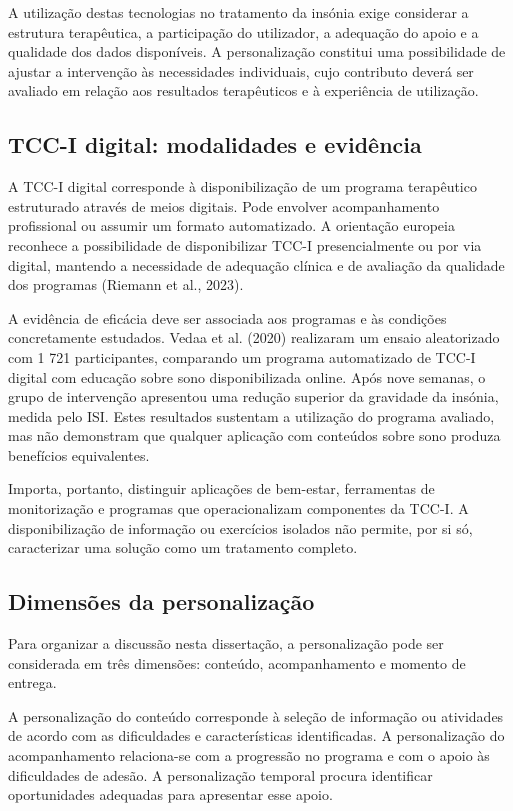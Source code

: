 A utilização destas tecnologias no tratamento da insónia exige considerar a estrutura terapêutica, a participação do utilizador, a adequação do apoio e a qualidade dos dados disponíveis. A personalização constitui uma possibilidade de ajustar a intervenção às necessidades individuais, cujo contributo deverá ser avaliado em relação aos resultados terapêuticos e à experiência de utilização.  


\subsection{TCC-I digital: modalidades e evidência}
\label{sec:chap2_tccDigital}

A TCC-I digital corresponde à disponibilização de um programa terapêutico estruturado através de meios digitais. Pode envolver acompanhamento profissional ou assumir um formato automatizado. A orientação europeia reconhece a possibilidade de disponibilizar TCC-I presencialmente ou por via digital, mantendo a necessidade de adequação clínica e de avaliação da qualidade dos programas (Riemann et al., 2023).

A evidência de eficácia deve ser associada aos programas e às condições concretamente estudados. Vedaa et al. (2020) realizaram um ensaio aleatorizado com 1 721 participantes, comparando um programa automatizado de TCC-I digital com educação sobre sono disponibilizada online. Após nove semanas, o grupo de intervenção apresentou uma redução superior da gravidade da insónia, medida pelo ISI. Estes resultados sustentam a utilização do programa avaliado, mas não demonstram que qualquer aplicação com conteúdos sobre sono produza benefícios equivalentes.

Importa, portanto, distinguir aplicações de bem-estar, ferramentas de monitorização e programas que operacionalizam componentes da TCC-I. A disponibilização de informação ou exercícios isolados não permite, por si só, caracterizar uma solução como um tratamento completo.


\subsection{Dimensões da personalização}
\label{sec:chap2_personalizacao}

Para organizar a discussão nesta dissertação, a personalização pode ser considerada em três dimensões: conteúdo, acompanhamento e momento de entrega.

A personalização do conteúdo corresponde à seleção de informação ou atividades de acordo com as dificuldades e características identificadas. A personalização do acompanhamento relaciona-se com a progressão no programa e com o apoio às dificuldades de adesão. A personalização temporal procura identificar oportunidades adequadas para apresentar esse apoio.

